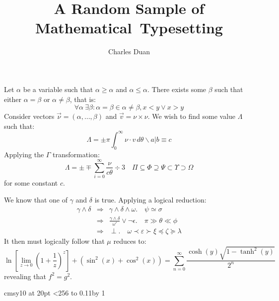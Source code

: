 \documentclass[12pt]{article}
\title{A Random Sample of Mathematical~Typesetting}
\author{Charles Duan}
\begin{document}
\maketitle

Let $\alpha$ be a variable such that $\alpha\ge\alpha$ and $\alpha\le\alpha$.
There exists some $\beta$ such that either $\alpha=\beta$ or $\alpha\ne\beta$,
that is:
\[
\forall\alpha\:\exists\beta: \alpha=\beta\in\alpha\ne\beta, x<y\vee x>y
\]
Consider vectors $\vec\nu=(\alpha,\ldots,\beta)$ and $\vec v=\nu\times\nu$. We
wish to find some value $\Lambda$ such that:
\[
\Lambda = \pm \pi \int_{0}^{\infty} \nu\cdot v\,d\theta\backslash a|b\equiv c
\]
Applying the $\Gamma$ transformation:
\[
\Lambda = \pm\mp\sum_{i=0}^{\infty}\frac{\nu}{c\theta}\div3\quad
\Pi\subseteq\Phi\supseteq\Psi\subset\Upsilon\supset\Omega
\]
for some constant $c$.

We know that one of $\gamma$ and $\delta$ is true. Applying a logical reduction:
\begin{eqnarray*}
\gamma\wedge\delta &\Longrightarrow& \gamma\wedge\delta\wedge\omega.\quad
\psi\simeq\sigma \\
&\Longrightarrow& \frac{\gamma\wedge\delta}{\omega'}\vee\neg\epsilon.\quad
\pi\gg\theta\ll\phi \\
&\Longrightarrow& \perp.\quad \omega\prec\varepsilon\succ\xi\preceq\zeta
\succeq\lambda
\end{eqnarray*}
It then must logically follow that $\mu$ reduces to:
\[
\ln\left[\lim_{z\rightarrow0}\left(1+\frac{1}{z}\right)^z\right]
+ \left(\sin^2(x) + \cos^2(x)\right)
= \sum_{n=0}^\infty \frac{\cosh(y)\sqrt{1-\tanh^2(y)}}{2^n}
\]
revealing that $f^2=g^2$.

\clearpage

\begingroup
\newcount\testcount {}
\font\myfont cmsy10 at 20pt
\loop\ifnum\testcount<256 \hbox to 0.11\textwidth{\the\testcount: \myfont\char\testcount\hfil}\hfil\advance\testcount by 1\repeat
\endgroup
\end{document}

